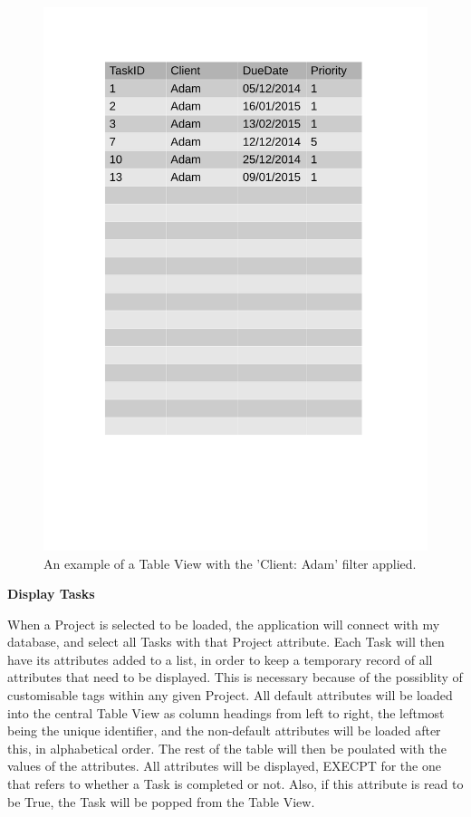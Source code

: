 \begin{figure}[H]
    \includegraphics[width=\textwidth]{./Design/Table_View_Example_with_filter.pdf}
    \caption{An example of a Table View with the 'Client: Adam' filter applied. } \label{fig:TableViewExampleWithFilter}
\end{figure}

\textbf{Display Tasks}

When a Project is selected to be loaded, the application will connect with my database, and select all Tasks with that Project attribute. Each Task will then have its attributes added to a list, in order to keep a temporary record of all attributes that need to be displayed. This is necessary because of the possiblity of customisable tags within any given Project. All default attributes will be loaded into the central Table View as column headings from left to right, the leftmost being the unique identifier, and the non-default attributes will be loaded after this, in alphabetical order. The rest of the table will then be poulated with the values of the attributes. All attributes will be displayed, EXECPT for the one that refers to whether a Task is completed or not. Also, if this attribute is read to be True, the Task will be popped from the Table View. 

